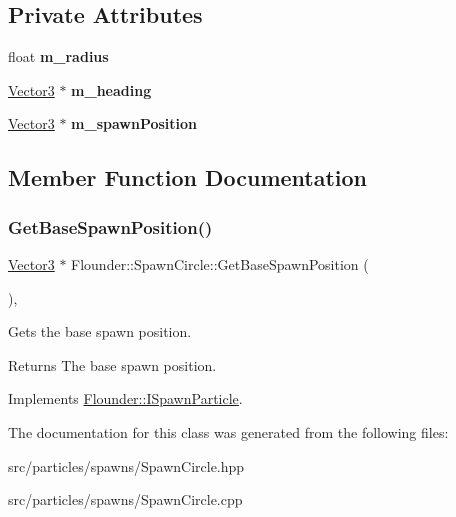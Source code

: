 \subsection*{Private Attributes}
\begin{DoxyCompactItemize}
\item 
\mbox{\label{class_flounder_1_1_spawn_circle_a4bdb11ed72f3ff47013fadbd9a40ad8a}} 
float {\bfseries m\+\_\+radius}
\item 
\mbox{\label{class_flounder_1_1_spawn_circle_a4eb9b850bdeda03e1d16466d771dd310}} 
\hyperlink{class_flounder_1_1_vector3}{Vector3} $\ast$ {\bfseries m\+\_\+heading}
\item 
\mbox{\label{class_flounder_1_1_spawn_circle_a21edfec1ae9ccfee296be8fc83fdb0a4}} 
\hyperlink{class_flounder_1_1_vector3}{Vector3} $\ast$ {\bfseries m\+\_\+spawn\+Position}
\end{DoxyCompactItemize}


\subsection{Member Function Documentation}
\mbox{\label{class_flounder_1_1_spawn_circle_a8f6d8449b4608abf4e45d9e045f20ae5}} 
\subsubsection{\texorpdfstring{Get\+Base\+Spawn\+Position()}{GetBaseSpawnPosition()}}
{\footnotesize\ttfamily \hyperlink{class_flounder_1_1_vector3}{Vector3} $\ast$ Flounder\+::\+Spawn\+Circle\+::\+Get\+Base\+Spawn\+Position (\begin{DoxyParamCaption}{ }\end{DoxyParamCaption})\hspace{0.3cm}{\ttfamily [override]}, {\ttfamily [virtual]}}



Gets the base spawn position. 

\begin{DoxyReturn}{Returns}
The base spawn position. 
\end{DoxyReturn}


Implements \hyperlink{class_flounder_1_1_i_spawn_particle_ac4adda7b65431918162f52ac1f4ce57d}{Flounder\+::\+I\+Spawn\+Particle}.



The documentation for this class was generated from the following files\+:\begin{DoxyCompactItemize}
\item 
src/particles/spawns/Spawn\+Circle.\+hpp\item 
src/particles/spawns/Spawn\+Circle.\+cpp\end{DoxyCompactItemize}
